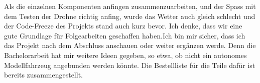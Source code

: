 Als die einzelnen Komponenten anfingen zusammenzuarbeiten, und der Spass mit dem Testen der Drohne richtig anfing, wurde das Wetter auch gleich schlecht und der Code-Freeze des Projekts stand auch kurz bevor. Ich denke, dass wir eine gute Grundlage für Folgearbeiten geschaffen haben.Ich bin mir sicher, dass ich das Projekt nach dem Abschluss anschauen oder weiter ergänzen werde.
Denn die Bachelorarbeit hat mir weitere Ideen gegeben, so etwa, ob nicht ein autonomes Modellfahrzeug angebunden werden könnte. Die Bestellliste für die Teile dafür ist bereits zusammengestellt.




